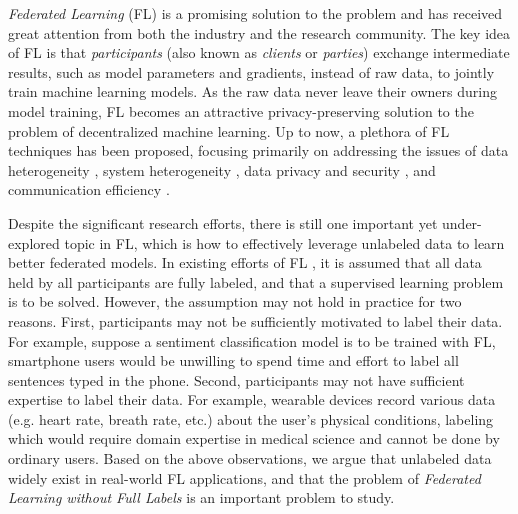 \documentclass[11pt]{article}
\begin{document}
\textit{Federated Learning} (FL) \cite{Yilun-yang2019federated,Yilun-kairouz2021advances} is a promising solution to the problem and has received great attention from both the industry and the research community. The key idea of FL is that \textit{participants} (also known as \textit{clients} or \textit{parties}) exchange intermediate results, such as model parameters and gradients, instead of raw data, to jointly train machine learning models. As the raw data never leave their owners during model training, FL becomes an attractive privacy-preserving solution to the problem of decentralized machine learning. Up to now, a plethora of FL techniques has been proposed, focusing primarily on addressing the issues of data heterogeneity \cite{Yilun-li2020federated,Yilun-karimireddy2020scaffold}, system heterogeneity \cite{Yilun-lai2021oort,Yilun-diao2021heterofl}, data privacy and security \cite{Yilun-bonawitz2017practical,Yilun-zhang2020batchcrypt}, and communication efficiency \cite{Yilun-mcmahan2017communication,Yilun-reisizadeh2020fedpaq}.

Despite the significant research efforts, there is still one important yet under-explored topic in FL, which is how to effectively leverage unlabeled data to learn better federated models. In existing efforts of FL \cite{Yilun-mcmahan2017communication,Yilun-li2020federated,Yilun-lai2021oort}, it is assumed that all data held by all participants are fully labeled, and that a supervised learning problem is to be solved. However, the assumption may not hold in practice for two reasons. First, participants may not be sufficiently motivated to label their data. For example, suppose a sentiment classification model is to be trained with FL, smartphone users would be unwilling to spend time and effort to label all sentences typed in the phone. Second, participants may not have sufficient expertise to label their data. For example, wearable devices record various data (e.g. heart rate, breath rate, etc.) about the user's physical conditions, labeling which would require domain expertise in medical science and cannot be done by ordinary users. Based on the above observations, we argue that unlabeled data widely exist in real-world FL applications, and that the problem of \textit{Federated Learning without Full Labels} is an important problem to study.
\end{document}

